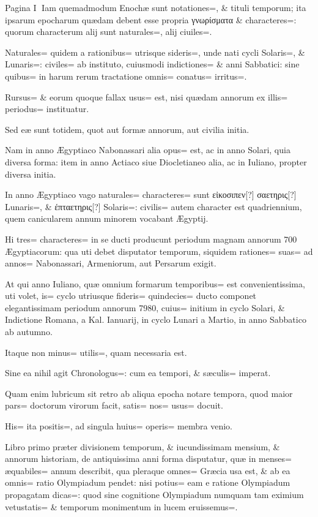 \begin{parnumbers}
Pagina  I
Iam quemadmodum Enochæ sunt notationes=, \& tituli temporum; ita ipsarum epocharum quædam debent esse propria γνωρίσματα \& characteres=: quorum characterum alij sunt naturales=, alij ciuiles=. 

Naturales= quidem a rationibus= utrisque sideris=, unde nati cycli Solaris=, \& Lunaris=: civiles= ab instituto, cuiusmodi indictiones= \& anni Sabbatici: sine quibus= in harum rerum tractatione omnis= conatus= irritus=. 

Rursus= \& eorum quoque fallax usus= est, nisi quædam annorum ex illis= periodus= instituatur.

Sed eæ sunt totidem, quot aut formæ annorum, aut civilia initia.

Nam in anno Ægyptiaco Nabonassari alia opus= est, ac in anno Solari, quia diversa forma: item in anno Actiaco siue Diocletianeo alia, ac in Iuliano, propter diversa initia.

In anno Ægyptiaco vago naturales= characteres= sunt εἰκοσιπεν[?] σαετηρις[?] Lunaris=, \& έπταετηρις[?] Solaris=: civilis= autem character est quadriennium, quem canicularem annum minorem vocabant Ægyptij.

Hi tres= characteres= in se ducti producunt periodum magnam annorum 700 Ægyptiacorum: qua uti debet disputator temporum, siquidem rationes= suas= ad annos= Nabonassari, Armeniorum, aut Persarum exigit.

At qui anno Iuliano, quæ omnium formarum temporibus= est convenientissima, uti volet, is= cyclo utriusque fideris= quindecies= ducto componet elegantissimam periodum annorum 7980, cuius= initium in cyclo Solari, \& Indictione Romana, a Kal. Ianuarij, in cyclo Lunari a Martio, in anno Sabbatico ab autumno.

Itaque non minus= utilis=, quam necessaria est.

Sine ea nihil agit Chronologus=: cum ea tempori, \& sæculis= imperat.

Quam enim lubricum sit retro ab aliqua epocha notare tempora, quod maior pars= doctorum virorum facit, satis= nos= usus= docuit.

His= ita positis=, ad singula huius= operis= membra venio.

Libro primo præter divisionem temporum, \& iucundissimam mensium, \& annorum historiam, de antiquissima anni forma disputatur, quæ in menses= æquabiles= annum describit, qua pleraque omnes= Græcia usa est, \& ab ea omnis= ratio Olympiadum pendet: nisi potius= eam e ratione Olympiadum propagatam dicas=: quod sine cognitione Olympiadum numquam tam eximium vetustatis= \& 
temporum monimentum in lucem eruissemus=. 


\end{parnumbers}
